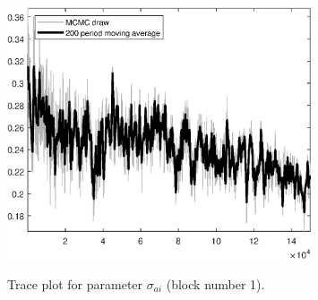 \begin{figure}[H]
\centering
  \includegraphics[width=0.8\textwidth]{BRS_sectoral_wo_gmf/graphs/TracePlot_sigma_ai_blck_1}\\
    \caption{Trace plot for parameter ${\sigma_{ai}}$ (block number 1).}
\end{figure}
